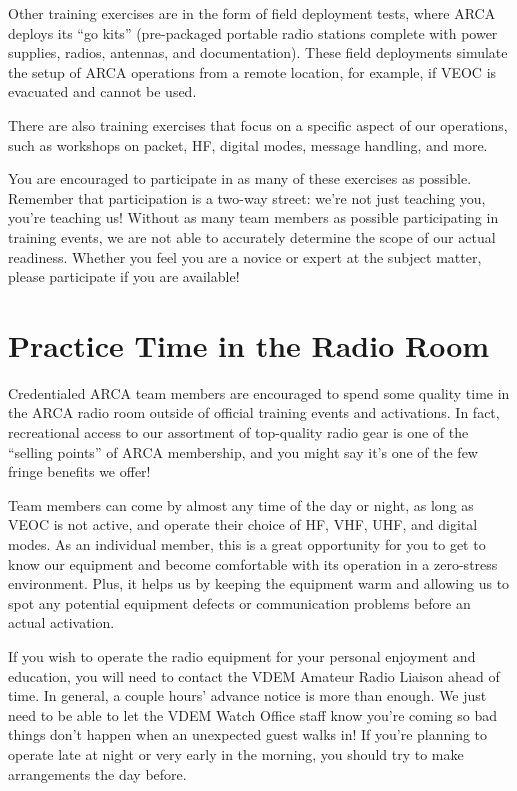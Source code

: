 \documentclass[pdflatex,letterpaper,twoside,12pt]{book}
\begin{document}
Other training exercises are in the form of field deployment tests, where ARCA deploys its ``go kits'' (pre-packaged portable radio stations complete with power supplies, radios, antennas, and documentation).  These field deployments simulate the setup of ARCA operations from a remote location, for example, if VEOC is evacuated and cannot be used.

There are also training exercises that focus on a specific aspect of our operations, such as workshops on packet, HF, digital modes, message handling, and more.

You are encouraged to participate in as many of these exercises as possible.  Remember that participation is a two-way street:  we're not just teaching you, you're teaching us!  Without as many team members as possible participating in training events, we are not able to accurately determine the scope of our actual readiness.  Whether you feel you are a novice or expert at the subject matter, please participate if you are available!


\section{Practice Time in the Radio Room}

Credentialed ARCA team members are encouraged to spend some quality time in the ARCA radio room outside of official training events and activations.  In fact, recreational access to our assortment of top-quality radio gear is one of the ``selling points'' of ARCA membership, and you might say it's one of the few fringe benefits we offer!

Team members can come by almost any time of the day or night, as long as VEOC is not active, and operate their choice of HF, VHF, UHF, and digital modes.  As an individual member, this is a great opportunity for you to get to know our equipment and become comfortable with its operation in a zero-stress environment.  Plus, it helps us by keeping the equipment warm and allowing us to spot any potential equipment defects or communication problems before an actual activation.

If you wish to operate the radio equipment for your personal enjoyment and education, you will need to contact the VDEM Amateur Radio Liaison ahead of time.  In general, a couple hours' advance notice is more than enough.  We just need to be able to let the VDEM Watch Office staff know you're coming so bad things don't happen when an unexpected guest walks in!  If you're planning to operate late at night or very early in the morning, you should try to make arrangements the day before.
\end{document}
